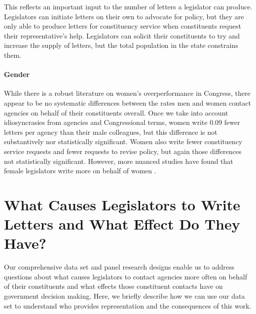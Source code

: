 \documentclass{article}
\begin{document}
 This reflects an important input to the number of letters a legislator can produce.  Legislators can initiate letters on their own to advocate for policy, but they are only able to produce letters for constituency service when constituents request their representative's help.  Legislators can solicit their constituents to try and increase the supply of letters, but the total population in the state constrains them.   





\paragraph{Gender} While there is a robust literature on women's overperformance in Congress, there appear to be no systematic differences between the rates men and women contact agencies on behalf of their constituents overall.  Once we take into account idiosyncrasies from agencies and Congressional terms, women write 0.09 fewer letters per agency than their male colleagues, but this difference is not substantively nor statistically significant.  Women also write fewer constituency service requests and fewer requests to revise policy, but again those differences not statistically significant.  However, more nuanced studies have found that female legislators write more on behalf of women \citet{LowandeRitchieLauterbach2018}. 



\section{What Causes Legislators to Write Letters and What Effect Do They Have?}

Our comprehensive data set and panel research designs enable us to address questions about what causes legislators to contact agencies more often on behalf of their constituents and what effects those constituent contacts have on government decision making.  Here, we briefly describe how we can use our data set to understand who provides representation and the consequences of this work.  
\end{document}
